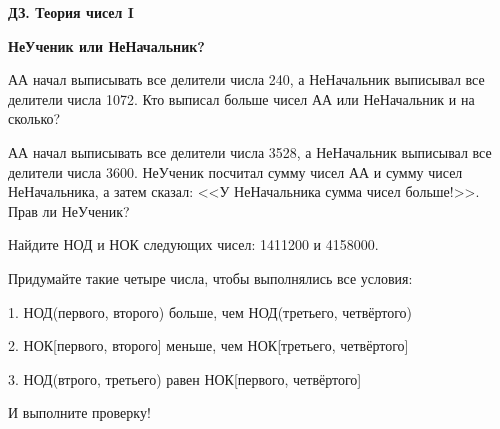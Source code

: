 \centerline{\bf \Huge ДЗ. Теория чисел I}
\centerline{\bf \Huge }

\begin{flushright}
        \scriptsize{\textbf{НеУченик или НеНачальник?}}
\end{flushright}

 АА начал выписывать все делители числа 240, а НеНачальник выписывал все делители числа 1072. Кто выписал больше чисел АА или НеНачальник и на сколько?

 АА начал выписывать все делители числа 3528, а НеНачальник выписывал все делители числа 3600. НеУченик посчитал сумму чисел АА и сумму чисел НеНачальника, а затем сказал: <<У НеНачальника сумма чисел больше!>>. Прав ли НеУченик?

 Найдите НОД и НОК следующих чисел: 1411200 и 4158000.

 Придумайте такие четыре числа, чтобы выполнялись все условия:

1. НОД(первого, второго) больше, чем НОД(третьего, четвёртого)

2. НОК[первого, второго] меньше, чем НОК[третьего, четвёртого]

3. НОД(втрого, третьего) равен НОК[первого, четвёртого]

И выполните проверку!

